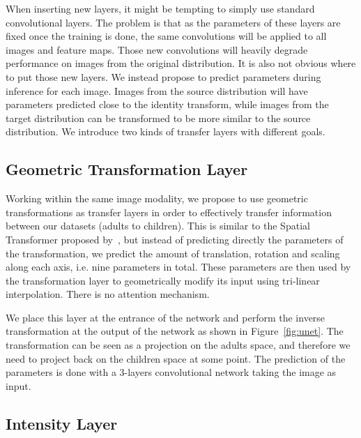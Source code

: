 When inserting new layers, it might be tempting to simply use standard convolutional layers. The problem is that as the parameters of these layers are fixed once the training is done, the same convolutions will be applied to all images and feature maps. Those new convolutions will heavily degrade performance on images from the original distribution. It is also not obvious where to put those new layers. We instead propose to predict parameters during inference for each image. Images from the source distribution will have parameters predicted close to the identity transform, while images from the target distribution can be transformed to be more similar to the source distribution. We introduce two kinds of transfer layers with different goals.


\subsection{Geometric Transformation Layer}

Working within the same image modality, we propose to use geometric transformations as transfer layers in order to effectively transfer information between our datasets (adults to children). 
This is similar to the Spatial Transformer proposed by~\textcite{jaderberg2015NIPS}, but instead of predicting directly the parameters of the transformation, we predict the amount of translation, rotation and scaling along each axis, i.e. nine parameters in total. These parameters are then used by the transformation layer to geometrically modify its input using tri-linear interpolation. There is no attention mechanism.

We place this layer at the entrance of the network and perform the inverse transformation at the output of the network as shown in Figure~\ref{fig:unet}. The transformation can be seen as a projection on the adults space, and therefore we need to project back on the children space at some point. The prediction of the parameters is done with a 3-layers convolutional network taking the image as input.

\subsection{Intensity Layer}


